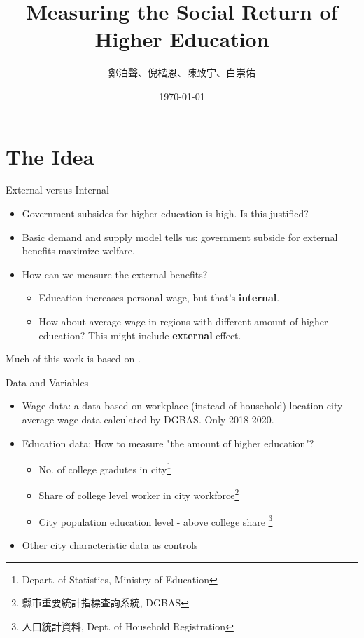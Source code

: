 \documentclass[compress]{beamer}
\title{Measuring the Social Return of Higher Education}
\author{鄭泊聲、倪楷恩、陳致宇、白崇佑}
\institute{國立台灣大學}
\date{\today}
\begin{document}

\begin{frame}
    \titlepage
\end{frame}

\section{The Idea}
\begin{frame}{External versus Internal}
  \begin{itemize}
    \item Government subsides for higher education is high. Is this justified?
    \item Basic demand and supply model tells us: government subside for external benefits maximize welfare.
    \item How can we measure the external benefits?
    \begin{itemize}
      \item Education increases personal wage, but that's \textbf{internal}.
    \item How about average wage in regions with different amount of higher education? This might include \textbf{external} effect. 
    \end{itemize}
    
  \end{itemize}
  Much of this work is based on \cite{MORETTI2004175}.
\end{frame}

\begin{frame}{Data and Variables}
  \begin{itemize}
    \item Wage data: a data based on workplace (instead of household) location city average wage data calculated by DGBAS. Only 2018-2020.
    \item Education data: How to measure "the amount of higher education"?
    \begin{itemize}
      \item No. of college gradutes in city\footnote{Depart. of Statistics, Ministry of Education}
      \item Share of college level worker in city workforce\footnote{縣市重要統計指標查詢系統, DGBAS}
      \item City population education level - above college share \footnote{人口統計資料, Dept. of Household Registration}
    \end{itemize}
    \item Other city characteristic data as controls
  \end{itemize}
\end{frame}
\end{document}
